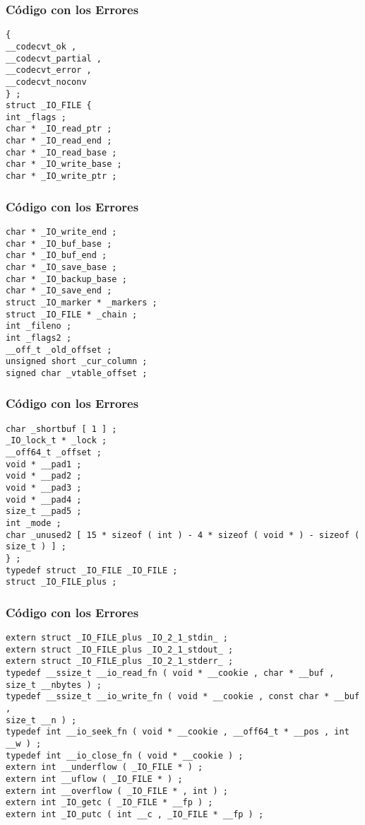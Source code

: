 \documentclass{beamer}
\begin{document}
\begin{frame}[fragile]
\frametitle{C\'odigo con los Errores}
\begin{lstlisting}[style=CStyle]
{ 
__codecvt_ok , 
__codecvt_partial , 
__codecvt_error , 
__codecvt_noconv 
} ; 
struct _IO_FILE { 
int _flags ; 
char * _IO_read_ptr ; 
char * _IO_read_end ; 
char * _IO_read_base ; 
char * _IO_write_base ; 
char * _IO_write_ptr ; 
\end{lstlisting}
\end{frame}
\begin{frame}[fragile]
\frametitle{C\'odigo con los Errores}
\begin{lstlisting}[style=CStyle]
char * _IO_write_end ; 
char * _IO_buf_base ; 
char * _IO_buf_end ; 
char * _IO_save_base ; 
char * _IO_backup_base ; 
char * _IO_save_end ; 
struct _IO_marker * _markers ; 
struct _IO_FILE * _chain ; 
int _fileno ; 
int _flags2 ; 
__off_t _old_offset ; 
unsigned short _cur_column ; 
signed char _vtable_offset ; 
\end{lstlisting}
\end{frame}
\begin{frame}[fragile]
\frametitle{C\'odigo con los Errores}
\begin{lstlisting}[style=CStyle]
char _shortbuf [ 1 ] ; 
_IO_lock_t * _lock ; 
__off64_t _offset ; 
void * __pad1 ; 
void * __pad2 ; 
void * __pad3 ; 
void * __pad4 ; 
size_t __pad5 ; 
int _mode ; 
char _unused2 [ 15 * sizeof ( int ) - 4 * sizeof ( void * ) - sizeof ( size_t ) ] ; 
} ; 
typedef struct _IO_FILE _IO_FILE ; 
struct _IO_FILE_plus ; 
\end{lstlisting}
\end{frame}
\begin{frame}[fragile]
\frametitle{C\'odigo con los Errores}
\begin{lstlisting}[style=CStyle]
extern struct _IO_FILE_plus _IO_2_1_stdin_ ; 
extern struct _IO_FILE_plus _IO_2_1_stdout_ ; 
extern struct _IO_FILE_plus _IO_2_1_stderr_ ; 
typedef __ssize_t __io_read_fn ( void * __cookie , char * __buf , size_t __nbytes ) ; 
typedef __ssize_t __io_write_fn ( void * __cookie , const char * __buf , 
size_t __n ) ; 
typedef int __io_seek_fn ( void * __cookie , __off64_t * __pos , int __w ) ; 
typedef int __io_close_fn ( void * __cookie ) ; 
extern int __underflow ( _IO_FILE * ) ; 
extern int __uflow ( _IO_FILE * ) ; 
extern int __overflow ( _IO_FILE * , int ) ; 
extern int _IO_getc ( _IO_FILE * __fp ) ; 
extern int _IO_putc ( int __c , _IO_FILE * __fp ) ; 
\end{lstlisting}
\end{frame}
\end{document}
